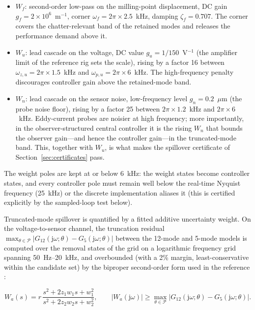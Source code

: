 \documentclass[preprint,12pt]{elsarticle}
\begin{document}
\begin{itemize}
\item $W_f$: second-order low-pass on the milling-point displacement,
DC gain $g_f = 2 \times 10^{6}$~m$^{-1}$, corner
$\omega_f = 2\pi \times 2.5$~kHz, damping $\zeta_f = 0.707$. The corner
covers the chatter-relevant band of the retained modes and releases the
performance demand above it.
\item $W_u$: lead cascade on the voltage, DC value
$g_u = 1/150$~V$^{-1}$ (the amplifier limit of the reference rig sets
the scale), rising by a factor 16 between
$\omega_{z,u} = 2\pi \times 1.5$~kHz and
$\omega_{p,u} = 2\pi \times 6$~kHz. The high-frequency penalty
discourages controller gain above the retained-mode band.
\item $W_n$: lead cascade on the sensor noise, low-frequency level
$g_n = 0.2$~$\mu$m (the probe noise floor), rising by a factor 25
between $2\pi \times 1.2$~kHz and $2\pi \times 6$~kHz. Eddy-current
probes are noisier at high frequency; more importantly, in the
observer-structured central controller it is the rising $W_n$ that
bounds the observer gain---and hence the controller gain---in the
truncated-mode band. This, together with $W_u$, is what makes the
spillover certificate of Section~\ref{sec:certificates} pass.
\end{itemize}

The weight poles are kept at or below 6~kHz: the weight states become
controller states, and every controller pole must remain well below the
real-time Nyquist frequency (25~kHz) or the discrete implementation
aliases it (this is certified explicitly by the sampled-loop test
below).

Truncated-mode spillover is quantified by a fitted additive uncertainty
weight. On the voltage-to-sensor channel, the truncation residual
$\max_{\theta \in \mathcal{P}}
| G_{12}(\mathrm{j}\omega; \theta) - G_{5}(\mathrm{j}\omega; \theta) |$
between the 12-mode and 5-mode models is computed over the removal
states of the grid on a logarithmic frequency grid spanning
50~Hz--20~kHz, and overbounded (with a 2\% margin, least-conservative
within the candidate set) by the biproper second-order form used in the
reference \cite{du2024robust}:

\begin{equation}
\label{eq:wa}
W_a(s) = r\, \frac{s^2 + 2 z_1 w_1 s + w_1^2}
{s^2 + 2 z_2 w_2 s + w_2^2},
\qquad
|W_a(\mathrm{j}\omega)| \ge
\max_{\theta \in \mathcal{P}}
\bigl| G_{12}(\mathrm{j}\omega; \theta)
- G_{5}(\mathrm{j}\omega; \theta) \bigr| .
\end{equation}
\end{document}

